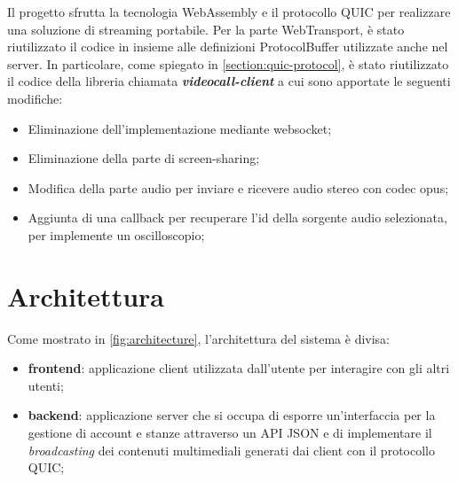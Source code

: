 \documentclass{article}
\begin{document}
Il progetto sfrutta la tecnologia WebAssembly e il protocollo QUIC per realizzare una 
soluzione di streaming portabile. Per la parte WebTransport, è stato riutilizzato
il codice in \cite{VideoCallRs} insieme alle definizioni ProtocolBuffer utilizzate 
anche nel server. In particolare,
come spiegato in \cref{section:quic-protocol}, è stato riutilizzato il codice della libreria chiamata
\textbf{\textit{videocall-client}} a cui sono apportate le seguenti modifiche:
\begin{itemize}
  \item Eliminazione dell'implementazione mediante websocket;
  \item Eliminazione della parte di screen-sharing;
  \item Modifica della parte audio per inviare e ricevere audio stereo con codec opus;
  \item Aggiunta di una callback per recuperare l'id della sorgente audio selezionata, per 
    implemente un oscilloscopio;
\end{itemize}

\clearpage


\section{Architettura}
Come mostrato in \cref{fig:architecture}, l'architettura del sistema è divisa:
\begin{itemize}
  \item \textbf{frontend}: applicazione client utilizzata dall'utente per interagire con 
    gli altri utenti;
  \item \textbf{backend}: applicazione server che si occupa di esporre un'interfaccia 
    per la gestione di account e stanze attraverso un API JSON e di implementare il 
    \textit{broadcasting} dei contenuti multimediali generati dai client con il protocollo
    QUIC;
\end{itemize}
\end{document}
